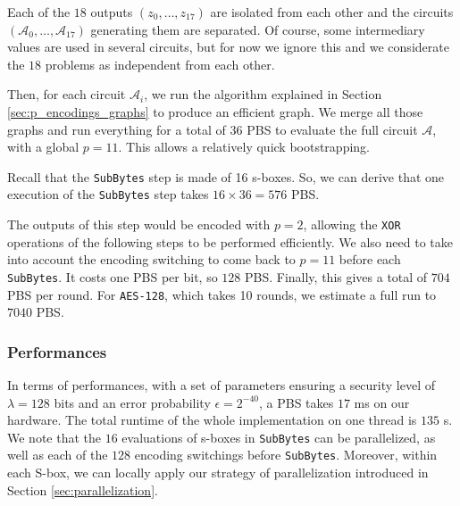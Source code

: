 Each of the $18$ outputs $(z_0, \dots, z_{17})$ are isolated from each other and the circuits $(\mathcal{A}_0, \dots, \mathcal{A}_{17})$ generating them are separated. Of course, some intermediary values are used in several circuits, but for now we ignore this and we considerate the $18$ problems as independent from each other. 

Then, for each circuit $\mathcal{A}_i$, we run the algorithm explained in Section \ref{sec:p_encodings_graphs} to produce an efficient graph. We merge all those graphs and run everything for a total of 36 \gls{PBS} to evaluate the full circuit $\mathcal{A}$, with a global $p = 11$. This allows a relatively quick bootstrapping.

Recall that the \texttt{SubBytes} step is made of 16 s-boxes. So, we can derive that one execution of the \texttt{SubBytes} step takes $16 \times 36 = 576$ \gls{PBS}. 

The outputs of this step would be encoded with $p=2$, allowing the \texttt{XOR} operations of the following steps to be performed efficiently. We also need to take into account the encoding switching to come back to $p=11$ before each \texttt{SubBytes}. It costs one \gls{PBS} per bit, so $128$ \gls{PBS}. Finally, this gives a total of $704$ \gls{PBS} per round. For \texttt{\gls{AES}-128}, which takes 10 rounds, we estimate a full run to $7040$ \gls{PBS}.

\subsubsection{Performances}

In terms of performances, with a set of parameters ensuring a security level of $\lambda=128$ bits and an error probability $\epsilon=2^{-40}$, a \gls{PBS} takes $17$ ms on our hardware. The total runtime of the whole implementation on one thread is $135$ s. We note that the $16$ evaluations of s-boxes in \texttt{SubBytes} can be parallelized, as well as each of the $128$ encoding switchings before \texttt{SubBytes}. Moreover, within each S-box, we can locally apply our strategy of parallelization introduced in Section \ref{sec:parallelization}.



